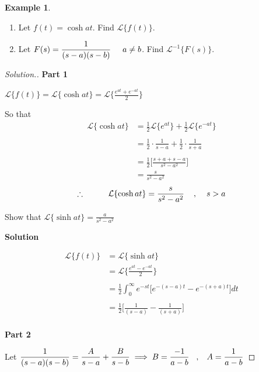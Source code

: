 \documentclass[11pt,a4paper]{article}
\theoremstyle{definition}
\newtheorem{exa}[thm]{Example}
\newenvironment{solution}
  {\renewcommand{\qedsymbol}{}\begin{proof}[\textit{Solution}.]}
  {\end{proof}}
\newcommand{\subhead}[1]{%
  \par\medskip\noindent\textbf{#1}\par\nobreak\smallskip}
\begin{document}
\begin{exa}
\begin{enumerate}
\item Let $\displaystyle{f(t) = \cosh at}$. Find $\mathcal{L}\{f(t)\}$.
\item Let $\displaystyle{ F(s) = \frac{1}{(s-a)(s-b)}}\hspace{0.5cm} a\neq b$. Find $\displaystyle{\mathcal{L}^{-1}\{F(s)\}}$.
\end{enumerate}
\end{exa}

\begin{solution}
\subhead{Part 1}
$\displaystyle{\mathcal{L}\{f(t)\}  = \mathcal{L}\{\cosh at\} = \mathcal{L}\Bigg\{\frac{e^{at} + e^{-at}}{2}\Bigg\}}$

So that
\begin{align*}
\mathcal{L}\{\cosh at\} & = \frac{1}{2}\mathcal{L}\{e^{at}\} + \frac{1}{2}\mathcal{L}\{e^{-at}\}\\\\
& = \frac{1}{2}\cdot\frac{1}{s - a} + \frac{1}{2}\cdot \frac{1}{s + a}\\\\
& = \frac{1}{2}\Big[\frac{s + a + s - a}{s^2 - a^2}\Big]\\
& = \frac{s}{s^2 - a^2}
\end{align*}
$$\therefore\hspace{1cm} \mathcal{L}\{\cosh at\} = \frac{s}{s^2 - a^2}\hspace{0.4cm}, \hspace{0.4cm} s>a$$

Show that $\displaystyle{\mathcal{L}\{\sinh at\} = \frac{ a}{s^2 - a^2}}$

\subhead{Solution}
\begin{align*}
\mathcal{L}\{f(t)\} & = \mathcal{L}\{\sinh at\}\\
& = \mathcal{L}\Bigg\{ \frac{e^{at} - e^{-at}}{2}\Bigg\}\\\\
& = \frac{1}{2}\int^{\infty}_0 e^{-st}\Big[e^{-(s-a)t} - e^{-(s+a)t}\Big]dt\\\\
& = \frac{1}{2}\Bigg[\frac{1}{(s - a)} - \frac{1}{(s+a)}\Bigg]\\
\end{align*}

\subhead{Part 2}
Let $\displaystyle{\frac{1}{(s -a)(s-b)} = \frac{A}{s -a} + \frac{B}{s -b}\implies B = \frac{-1}{a - b}\hspace{0.3cm},\hspace{0.3cm}A =\frac{1}{a - b}}$


\end{solution}
\end{document}
